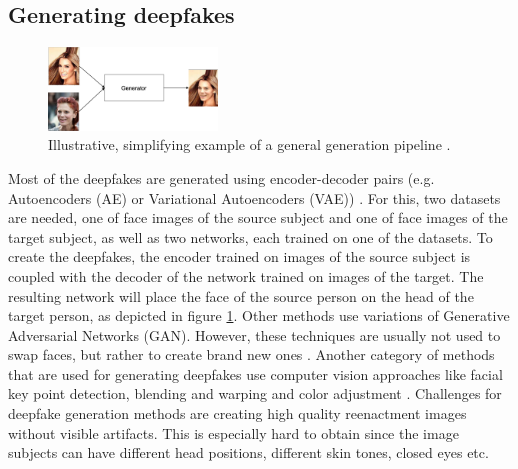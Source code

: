 \documentclass[11pt]{article}
\begin{document}
\subsection*{Generating deepfakes}
\begin{figure}
  \centering
    \includegraphics[width=0.4\textwidth]{figures/DFGenerationEx.png}
  \caption{Illustrative, simplifying example of a general generation pipeline \cite{liu2015faceattributes}.}
  \label{fig:dfgeneration}
\end{figure}
Most of the deepfakes are generated using  encoder-decoder pairs (e.g. Autoencoders (AE) or Variational Autoencoders (VAE)) \cite{nguyen2021deep}. For this, two datasets are needed, one of face images of the source subject and one of face images of the target subject, as well as two networks, each trained on one of the datasets. To create the deepfakes, the encoder trained on images of the source subject is coupled with the decoder of the network trained on images of the target. The resulting network will place the face of the source person on the head of the target person, as depicted in figure \ref{fig:dfgeneration}. Other methods use variations of Generative Adversarial Networks (GAN). However, these techniques are usually not used to swap faces, but rather to create brand new ones \cite{karras2020analyzing}. Another category of methods that are used for generating deepfakes use computer vision approaches like facial key point detection, blending and warping and color adjustment \cite{li2020face}. Challenges for deepfake generation methods are creating high quality reenactment images without visible artifacts. This is especially hard to obtain since the image subjects can have different head positions, different skin tones, closed eyes etc. 
\end{document}
